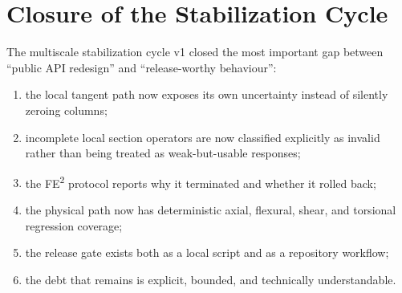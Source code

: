 \section{Closure of the Stabilization Cycle}
\label{sec:ms-stab-close}

The multiscale stabilization cycle v1 closed the most important gap between
``public API redesign'' and ``release-worthy behaviour'':
\begin{enumerate}
  \item the local tangent path now exposes its own uncertainty instead of
    silently zeroing columns;
  \item incomplete local section operators are now classified explicitly as
    invalid rather than being treated as weak-but-usable responses;
  \item the FE\textsuperscript{2} protocol reports why it terminated and
    whether it rolled back;
  \item the physical path now has deterministic axial, flexural, shear, and
    torsional regression coverage;
  \item the release gate exists both as a local script and as a repository
    workflow;
  \item the debt that remains is explicit, bounded, and technically
    understandable.
\end{enumerate}
